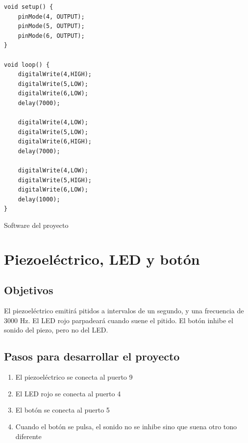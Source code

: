\documentclass[11pt,spanish,a4paper]{article}
\begin{document}
\begin{listing}[H]
\begin{verbatim}
void setup() {
    pinMode(4, OUTPUT);
    pinMode(5, OUTPUT);
    pinMode(6, OUTPUT);
}

void loop() {
    digitalWrite(4,HIGH);
    digitalWrite(5,LOW);
    digitalWrite(6,LOW);
    delay(7000);

    digitalWrite(4,LOW);
    digitalWrite(5,LOW);
    digitalWrite(6,HIGH);
    delay(7000);

    digitalWrite(4,LOW);
    digitalWrite(5,HIGH);
    digitalWrite(6,LOW);
    delay(1000);
}
\end{verbatim}
\caption{Software del proyecto \thesection}
\end{listing}


\newpage
\section{Piezoeléctrico, LED y botón}

\subsection{Objetivos} El piezoeléctrico emitirá pitidos a intervalos de un segundo, y una frecuencia
de 3000 Hz. El LED rojo
parpadeará cuando suene el pitido. El botón inhibe el sonido del piezo, pero no del LED.

\subsection{Pasos para desarrollar el proyecto}
\begin{enumerate}
	\item El piezoeléctrico se conecta al puerto 9
	\item El LED rojo se conecta al puerto 4
	\item El botón se conecta al puerto 5
	\item Cuando el botón se pulsa, el sonido no se inhibe sino que suena otro tono diferente
\end{enumerate}
\end{document}
